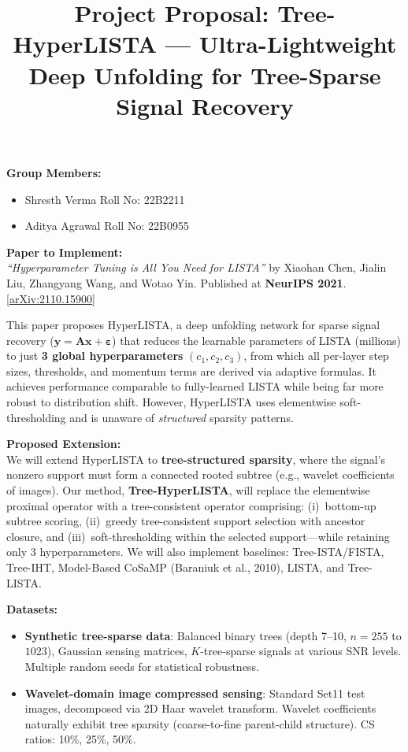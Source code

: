 \documentclass[11pt]{article}
\title{\vspace{-2.5em}\textbf{Project Proposal: Tree-HyperLISTA --- Ultra-Lightweight Deep Unfolding for Tree-Sparse Signal Recovery}\vspace{-1em}}
\author{}
\date{}
\begin{document}
\maketitle
\vspace{-2.5em}

\textbf{Group Members:}
\begin{itemize}[nosep, leftmargin=1.5em]
    \item Shresth Verma \hfill Roll No: 22B2211
    \item Aditya Agrawal \hfill Roll No: 22B0955
\end{itemize}

\textbf{Paper to Implement:}\\
\textit{``Hyperparameter Tuning is All You Need for LISTA''} by Xiaohan Chen, Jialin Liu, Zhangyang Wang, and Wotao Yin. Published at \textbf{NeurIPS 2021}. [\href{https://arxiv.org/abs/2110.15900}{arXiv:2110.15900}]

This paper proposes HyperLISTA, a deep unfolding network for sparse signal recovery ($\mathbf{y} = \mathbf{A}\mathbf{x} + \boldsymbol{\varepsilon}$) that reduces the learnable parameters of LISTA (millions) to just \textbf{3 global hyperparameters} $(c_1, c_2, c_3)$, from which all per-layer step sizes, thresholds, and momentum terms are derived via adaptive formulas. It achieves performance comparable to fully-learned LISTA while being far more robust to distribution shift. However, HyperLISTA uses elementwise soft-thresholding and is unaware of \emph{structured} sparsity patterns.

\textbf{Proposed Extension:}\\
We will extend HyperLISTA to \textbf{tree-structured sparsity}, where the signal's nonzero support must form a connected rooted subtree (e.g., wavelet coefficients of images). Our method, \textbf{Tree-HyperLISTA}, will replace the elementwise proximal operator with a tree-consistent operator comprising: (i)~bottom-up subtree scoring, (ii)~greedy tree-consistent support selection with ancestor closure, and (iii)~soft-thresholding within the selected support---while retaining only 3 hyperparameters. We will also implement baselines: Tree-ISTA/FISTA, Tree-IHT, Model-Based CoSaMP (Baraniuk et al., 2010), LISTA, and Tree-LISTA.

\textbf{Datasets:}
\begin{itemize}[nosep, leftmargin=1.5em]
    \item \textbf{Synthetic tree-sparse data}: Balanced binary trees (depth 7--10, $n = 255$ to $1023$), Gaussian sensing matrices, $K$-tree-sparse signals at various SNR levels. Multiple random seeds for statistical robustness.
    \item \textbf{Wavelet-domain image compressed sensing}: Standard Set11 test images, decomposed via 2D Haar wavelet transform. Wavelet coefficients naturally exhibit tree sparsity (coarse-to-fine parent-child structure). CS ratios: 10\%, 25\%, 50\%.
\end{itemize}
\end{document}
